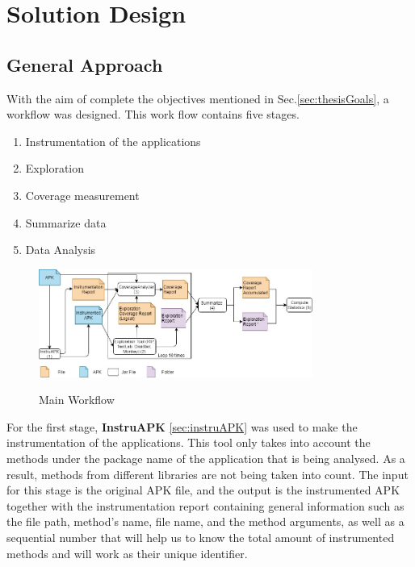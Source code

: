 
\chapter{Solution Design} %

\label{Chapter4} %

\section{General Approach} \label{sec:generalApproach}

With the aim of complete the objectives mentioned in Sec.\ref{sec:thesisGoals}, a workflow was designed. This work flow contains five stages.

\begin{enumerate}
	\item Instrumentation of the applications
	\item Exploration
	\item Coverage measurement
	\item Summarize data
	\item Data Analysis
\end{enumerate}

\begin{figure}[h]
\centering
\includegraphics[width=0.8\textwidth]{../Figures/workflow.jpg}
\label{fig:workflow}
\caption{Main Workflow}
\end{figure}

For the first stage, \textbf{InstruAPK} \ref{sec:instruAPK} was used to make the instrumentation of the applications. This tool only takes into account the methods under the package name of the application that is being analysed. As a result, methods from different libraries are not being taken into count. The input for this stage is the original APK file, and the output is the instrumented APK together with the instrumentation report containing general information such as the file path, method's name, file name, and the method arguments, as well as a sequential number that will help us to know the total amount of instrumented methods and will work as their unique identifier.

